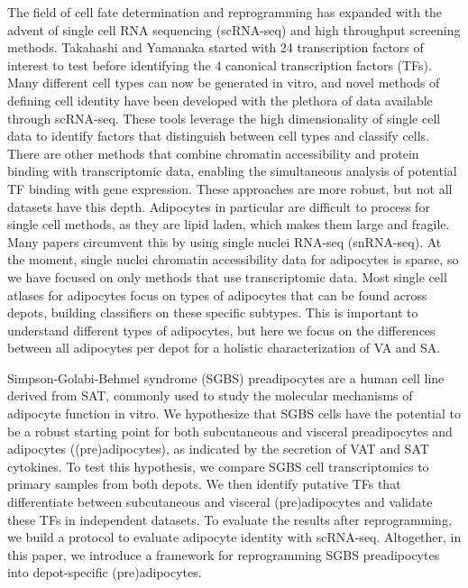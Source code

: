 The field of cell fate determination and reprogramming has expanded with the advent of single cell RNA sequencing (scRNA-seq) and high throughput screening methods. Takahashi and Yamanaka started with 24 transcription factors of interest to test before identifying the 4 canonical transcription factors (TFs)\cite{Takahashi2006-xh}. Many different cell types can now be generated in vitro\cite{Missinato2023-ey,Song2012-mv}, and novel methods of defining cell identity have been developed with the plethora of data available through scRNA-seq\cite{Tan2019-lt,Alquicira-Hernandez2019-dw,Kong2022-pg}. These tools leverage the high dimensionality of single cell data to identify factors that distinguish between cell types and classify cells. There are other methods that combine chromatin accessibility and protein binding with transcriptomic data, enabling the simultaneous analysis of potential TF binding with gene expression\cite{Wang2023-fj,Jung2021-bf,Hammelman2022-hq}. These approaches are more robust, but not all datasets have this depth. Adipocytes in particular are difficult to process for single cell methods, as they are lipid laden, which makes them large and fragile. Many papers circumvent this by using single nuclei RNA-seq (snRNA-seq)\cite{Emont2022-pb,Sun2020-ep}. At the moment, single nuclei chromatin accessibility data for adipocytes is sparse, so we have focused on only methods that use transcriptomic data. Most single cell atlases for adipocytes focus on types of adipocytes that can be found across depots, building classifiers on these specific subtypes\cite{Lazarescu2025-ru,Emont2022-pb}. This is important to understand different types of adipocytes, but here we focus on the differences between all adipocytes per depot for a holistic characterization of VA and SA.  

Simpson-Golabi-Behmel syndrome (SGBS) preadipocytes are a human cell line derived from SAT, commonly used to study the molecular mechanisms of adipocyte function in vitro\cite{Wabitsch2001-rx,Tews2022-am}. We hypothesize that SGBS cells have the potential to be a robust starting point for both subcutaneous and visceral preadipocytes and adipocytes ((pre)adipocytes), as indicated by the secretion of VAT and SAT cytokines\cite{Rosenow2010-tk}. To test this hypothesis, we compare SGBS cell transcriptomics to primary samples from both depots. We then identify putative TFs that differentiate between subcutaneous and visceral (pre)adipocytes and validate these TFs in independent datasets. To evaluate the results after reprogramming, we build a protocol to evaluate adipocyte identity with scRNA-seq. Altogether, in this paper, we introduce a framework for reprogramming SGBS preadipocytes into depot-specific (pre)adipocytes.

